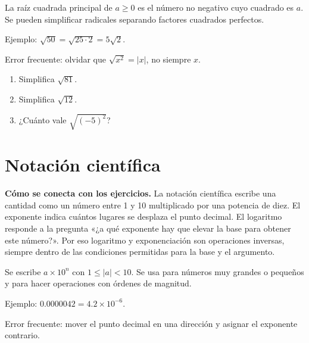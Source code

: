 \documentclass[10pt,oneside,openany]{book}
\begin{document}
La raíz cuadrada principal de $a\geq0$ es el número no negativo cuyo cuadrado es $a$. Se pueden simplificar radicales separando factores cuadrados perfectos.

\begin{ejemplo}
Ejemplo: $\sqrt{50}=\sqrt{25\cdot2}=5\sqrt2$.
\end{ejemplo}

\begin{ojo}
Error frecuente: olvidar que $\sqrt{x^2}=|x|$, no siempre $x$.
\end{ojo}

\begin{practica}

\begin{enumerate}

\item Simplifica $\sqrt{81}$.

\item Simplifica $\sqrt{12}$.

\item ¿Cuánto vale $\sqrt{(-5)^2}$?

\end{enumerate}

\end{practica}



\section{Notación científica}

\textbf{Cómo se conecta con los ejercicios.} La notación científica escribe una cantidad como un número entre 1 y 10 multiplicado por una potencia de diez. El exponente indica cuántos lugares se desplaza el punto decimal. El logaritmo responde a la pregunta «¿a qué exponente hay que elevar la base para obtener este número?». Por eso logaritmo y exponenciación son operaciones inversas, siempre dentro de las condiciones permitidas para la base y el argumento.

Se escribe $a\times10^n$ con $1\leq|a|<10$. Se usa para números muy grandes o pequeños y para hacer operaciones con órdenes de magnitud.

\begin{ejemplo}
Ejemplo: $0.0000042=4.2\times10^{-6}$.
\end{ejemplo}

\begin{ojo}
Error frecuente: mover el punto decimal en una dirección y asignar el exponente contrario.
\end{ojo}
\end{document}
